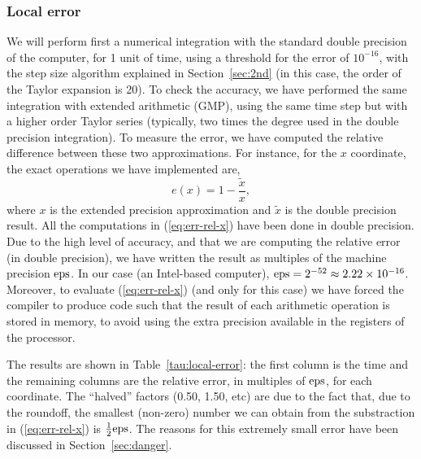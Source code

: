 \documentclass[12pt,twoside]{article}
\newcommand{\eps}{\mbox{\rm eps}}
\begin{document}
\subsubsection{Local error}\label{sec:localerror-rtbp}
We will perform first a numerical integration with the standard double
precision of the computer, for 1 unit of time, using a threshold for
the error of $10^{-16}$, with the step size algorithm explained in
Section~\ref{sec:2nd} (in this case, the order of the Taylor expansion
is 20). To check the accuracy, we have performed the same integration
with extended arithmetic (GMP), using the same time step but with a
higher order Taylor series (typically, two times the degree used in
the double precision integration). To measure the error, we have
computed the relative difference between these two approximations. For
instance, for the $x$ coordinate, the exact operations we have
implemented are,
\begin{equation}
e(x)=1-\frac{\tilde x}{x},
\label{eq:err-rel-x}
\end{equation}
where $x$ is the extended precision approximation and $\tilde x$ is
the double precision result. All the computations in
(\ref{eq:err-rel-x}) have been done in double precision.  Due to the
high level of accuracy, and that we are computing the relative error
(in double precision), we have written the result as multiples of the
machine precision $\eps$. In our case (an Intel-based computer),
$\eps=2^{-52}\approx 2.22\times 10^{-16}$. Moreover, to evaluate
(\ref{eq:err-rel-x}) (and only for this case) we have forced the
compiler to produce code such that the result of each arithmetic
operation is stored in memory, to avoid using the extra precision
available in the registers of the processor.

The results are shown in Table~\ref{tau:local-error}: the first column
is the time and the remaining columns are the relative error, in
multiples of $\eps$, for each coordinate. The ``halved'' factors
(0.50, 1.50, etc) are due to the fact that, due to the roundoff, the
smallest (non-zero) number we can obtain from the substraction in
(\ref{eq:err-rel-x}) is $\frac{1}{2}\eps$. The reasons for this
extremely small error have been discussed in Section~\ref{sec:danger}.
\end{document}
